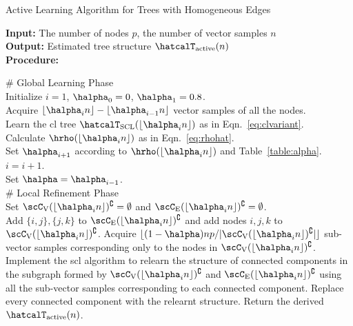 \documentclass[11pt,onecolumn]{article}
\newcommand{\Active}{{\rm active}}
\begin{document}
\begin{algorithm}[t]
	\caption{Active Learning Algorithm for Trees with Homogeneous Edges}
	\textbf{Input:}  The number of nodes $p$, the number of vector samples $n$\\
	\textbf{Output:} Estimated tree structure $\hatcalT_{\Active}(n)$ \\
	\textbf{Procedure:}
	\begin{algorithmic}[1]\label{algo:alathe}
		\STATE \# Global Learning Phase\\
		\STATE Initialize $i=1$, $\halpha_{0}=0$, $\halpha_{1}=0.8$.\\
			\STATE Acquire $\lfloor\halpha_{i}n\rfloor-\lfloor\halpha_{i-1}n\rfloor$ vector samples of all the nodes.\\
			\STATE Learn the \ac{cl} tree $\hatcalT_{\rm{SCL}}(\lfloor\halpha_{i}n\rfloor)$ as in Eqn.~\eqref{eq:clvariant}.\\
			\STATE Calculate $\hrho(\lfloor\halpha_{i}n\rfloor)$ as in Eqn.~\eqref{eq:rhohat}.\\
			\STATE Set $\halpha_{i+1}$ according to $\hrho(\lfloor\halpha_{i}n\rfloor)$ and Table~\ref{table:alpha}.\\
			\STATE $i=i+1$.\\
		\ENDWHILE
		\STATE Set $\halpha=\halpha_{i-1}$. \\%
		\STATE \# Local Refinement Phase\\
		\STATE Set $\scC_{\mathrm{V}}(\lfloor\halpha_{i}n\rfloor)^{\complement}=\emptyset$ and $\scC_{\mathrm{E}}(\lfloor\halpha_{i}n\rfloor)^{\complement}=\emptyset$.\\
				\STATE Add $\{i,j\},\{j,k\}$ to $\scC_{\mathrm{E}}(\lfloor\halpha_{i}n\rfloor)^{\complement}$ and add nodes $i,j,k$ to $\scC_{\mathrm{V}}(\lfloor\halpha_{i}n\rfloor)^{\complement}$.
			\ENDIF
		\ENDFOR
		\STATE Acquire $\lfloor(1-\halpha)np/|\scC_{\mathrm{V}}(\lfloor\halpha_{i}n\rfloor)^{\complement}| \rfloor$  sub-vector samples corresponding only to the nodes in $\scC_{\mathrm{V}}(\lfloor\halpha_{i}n\rfloor)^{\complement}$.\\
		\STATE Implement the \ac{scl} algorithm to relearn the structure of connected components in the subgraph formed by $\scC_{\mathrm{V}}(\lfloor\halpha_{i}n\rfloor)^{\complement}$ and $\scC_{\mathrm{E}}(\lfloor\halpha_{i}n\rfloor)^{\complement}$ using all the sub-vector samples corresponding to each connected component.
		\STATE Replace every connected component with the relearnt structure.
		\STATE Return the derived $\hatcalT_{\Active}(n)$.
	\end{algorithmic}
\end{algorithm}
\end{document}
